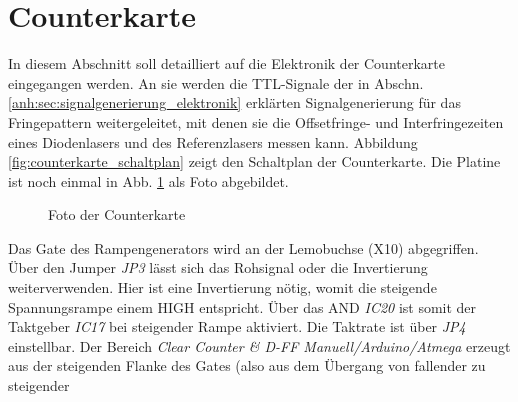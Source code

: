 \section{Counterkarte}\label{anh:sec:counterkarte}
In diesem Abschnitt soll detailliert auf die Elektronik der Counterkarte
eingegangen werden. An sie werden die TTL-Signale der in Abschn.
\ref{anh:sec:signalgenerierung_elektronik} erklärten Signalgenerierung für das
Fringepattern weitergeleitet, mit denen sie die Offsetfringe- und
Interfringezeiten eines Diodenlasers und des Referenzlasers messen kann.
Abbildung \ref{fig:counterkarte_schaltplan} zeigt den Schaltplan der
Counterkarte. Die Platine ist noch einmal in Abb.
\ref{fig:counterkarte_foto} als Foto abgebildet.\par
\begin{figure}[h]
 	\centering
	\caption[Counterkarte -	Foto]{Foto der Counterkarte}
	\label{fig:counterkarte_foto}
\end{figure}
Das Gate des Rampengenerators wird an der Lemobuchse (X10) abgegriffen.
Über den Jumper \textit{JP3} lässt sich das Rohsignal oder die Invertierung weiterverwenden.
Hier ist eine Invertierung nötig, womit die steigende Spannungsrampe einem HIGH entspricht.
Über das AND \textit{IC20} ist somit der Taktgeber \textit{IC17} bei steigender
Rampe aktiviert. Die Taktrate ist über \textit{JP4} einstellbar. Der Bereich
\textit{Clear Counter \& D-FF Manuell/Arduino/Atmega} erzeugt aus der
steigenden Flanke des Gates (also aus dem Übergang von fallender zu steigender
